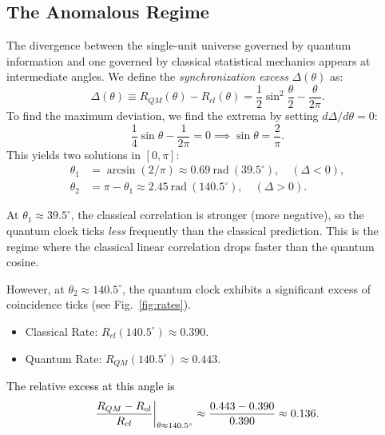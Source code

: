 \documentclass[reprint,aps,pra,longbibliography]{revtex4-2}
\newcommand{\rev}[1]{\textcolor{black}{#1}} %
\begin{document}
\subsection{The Anomalous Regime}

The divergence between the single-unit universe governed by quantum information and one governed by classical statistical mechanics appears at intermediate angles. We define the \emph{synchronization excess} $\Delta(\theta)$ as:
\begin{equation}
\Delta(\theta) \equiv R_{QM}(\theta) - R_{cl}(\theta) = \frac{1}{2}\sin^2\frac{\theta}{2} - \frac{\theta}{2\pi}.
\end{equation}
To find the maximum deviation, we find the extrema by setting $d\Delta/d\theta = 0$:
\begin{equation}
\frac{1}{4}\sin\theta - \frac{1}{2\pi} = 0 \implies \sin\theta = \frac{2}{\pi}.
\end{equation}
This yields two solutions in $[0, \pi]$:
\begin{align}
\theta_1 &= \arcsin(2/\pi) \approx 0.69~\text{rad}~(39.5^\circ), \quad (\Delta < 0), \\
\theta_2 &= \pi - \theta_1 \approx 2.45~\text{rad}~(140.5^\circ), \quad (\Delta > 0).
\end{align}

At $\theta_1 \approx 39.5^\circ$, the classical correlation is stronger (more negative), so the quantum clock ticks \emph{less} frequently than the classical prediction. This is the regime where the classical linear correlation drops faster than the quantum cosine.

However, at $\theta_2 \approx 140.5^\circ$, the quantum clock exhibits a significant excess of coincidence ticks (see Fig.~\ref{fig:rates}).
\begin{itemize}
    \item Classical Rate: $R_{cl}(140.5^\circ) \approx 0.390$.
    \item Quantum Rate: $R_{QM}(140.5^\circ) \approx 0.443$.
\end{itemize}
\rev{The relative excess at this angle is}
\[
\rev{\frac{R_{QM}-R_{cl}}{R_{cl}}\bigg|_{\theta\approx 140.5^\circ}\approx \frac{0.443-0.390}{0.390}\approx 0.136.}
\]
\end{document}
